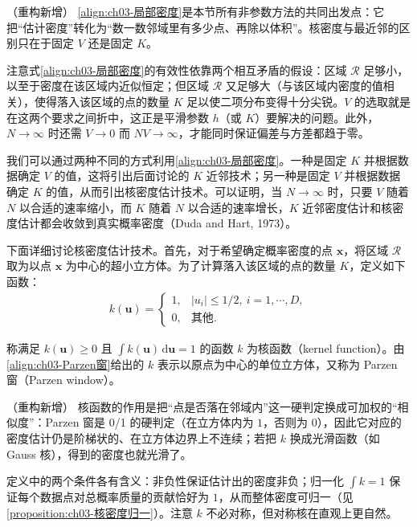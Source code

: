\documentclass[../../main.tex]{subfiles}
\begin{document}
\begin{remark}（重构新增）
\eqref{align:ch03-局部密度}是本节所有非参数方法的共同出发点：它把“估计密度”转化为“数一数邻域里有多少点、再除以体积”。核密度与最近邻的区别只在于固定 $V$ 还是固定 $K$。

注意式\eqref{align:ch03-局部密度}的有效性依靠两个相互矛盾的假设：区域 $\mathcal{R}$ 足够小，以至于密度在该区域内近似恒定；但区域 $\mathcal{R}$ 又足够大（与该区域内密度的值相关），使得落入该区域的点的数量 $K$ 足以使二项分布变得十分尖锐。$V$ 的选取就是在这两个要求之间折中，这正是平滑参数 $h$（或 $K$）要解决的问题。此外，$N\to\infty$ 时还需 $V\to0$ 而 $NV\to\infty$，才能同时保证偏差与方差都趋于零。
\end{remark}

我们可以通过两种不同的方式利用\eqref{align:ch03-局部密度}。一种是固定 $K$ 并根据数据确定 $V$ 的值，这将引出后面讨论的 $K$ 近邻技术；另一种是固定 $V$ 并根据数据确定 $K$ 的值，从而引出核密度估计技术。可以证明，当 $N\to\infty$ 时，只要 $V$ 随着 $N$ 以合适的速率缩小，而 $K$ 随着 $N$ 以合适的速率增长，$K$ 近邻密度估计和核密度估计都会收敛到真实概率密度（Duda and Hart, 1973）。

下面详细讨论核密度估计技术。首先，对于希望确定概率密度的点 $\boldsymbol{x}$，将区域 $\mathcal{R}$ 取为以点 $\boldsymbol{x}$ 为中心的超小立方体。为了计算落入该区域的点的数量 $K$，定义如下函数：
\begin{align}
k(\boldsymbol{u})=\begin{cases}1, & \lvert u_i\rvert\leqslant1/2,\ i=1,\cdots,D,\\ 0, & \text{其他}.\end{cases}
\label{align:ch03-Parzen窗}
\end{align}

\begin{definition}\label{definition:ch03-核函数}
称满足 $k(\boldsymbol{u})\geqslant0$ 且 $\int k(\boldsymbol{u})\,\mathrm{d}\boldsymbol{u}=1$ 的函数 $k$ 为核函数（kernel function）。由\eqref{align:ch03-Parzen窗}给出的 $k$ 表示以原点为中心的单位立方体，又称为 Parzen 窗（Parzen window）。
\end{definition}

\begin{remark}（重构新增）
核函数的作用是把“点是否落在邻域内”这一硬判定换成可加权的“相似度”：Parzen 窗是 0/1 的硬判定（在立方体内为 $1$，否则为 $0$），因此它对应的密度估计仍是阶梯状的、在立方体边界上不连续；若把 $k$ 换成光滑函数（如 Gauss 核），得到的密度也就光滑了。

定义中的两个条件各有含义：非负性保证估计出的密度非负；归一化 $\int k=1$ 保证每个数据点对总概率质量的贡献恰好为 $1$，从而整体密度可归一（见\cref{proposition:ch03-核密度归一}）。注意 $k$ 不必对称，但对称核在直观上更自然。
\end{remark}
\end{document}
